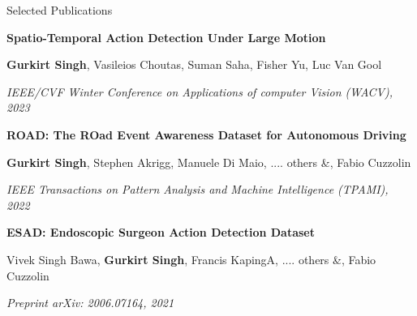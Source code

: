 \documentclass{resume} %
\begin{document}
\vspace{0.1in}
\begin{rSection}{Selected Publications}

\textbf{Spatio-Temporal Action Detection Under Large Motion}

\vspace{-0.08in}
\small{\textbf{Gurkirt Singh}, Vasileios Choutas, Suman Saha, Fisher Yu, Luc Van Gool}

\vspace{-0.08in}
\textit{\small{IEEE/CVF Winter Conference on Applications of computer Vision (WACV), 2023}}

\vspace{-0.03in}
\textbf{ROAD: The ROad Event Awareness Dataset for Autonomous Driving}

\vspace{-0.08in}
\small{\textbf{Gurkirt Singh}, Stephen Akrigg, Manuele Di Maio, .... others \&,
Fabio Cuzzolin}

\vspace{-0.08in}
\textit{\small{IEEE Transactions on Pattern Analysis and Machine Intelligence (TPAMI), 2022}}


\vspace{-0.03in}
\textbf{ESAD: Endoscopic Surgeon Action Detection Dataset}

\vspace{-0.08in}
\small{Vivek Singh Bawa, \textbf{Gurkirt Singh}, Francis KapingA, .... others \&, 
Fabio Cuzzolin}

\vspace{-0.08in}
\textit{\small{Preprint arXiv: 2006.07164, 2021}}



\end{rSection}
\end{document}
